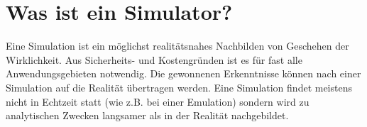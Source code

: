 ﻿\section{Was ist ein Simulator?}

Eine Simulation ist ein möglichst realitätsnahes Nachbilden von Geschehen der Wirklichkeit. Aus Sicherheits- und Kostengründen ist es für fast alle Anwendungsgebieten notwendig. Die gewonnenen Erkenntnisse können nach einer Simulation auf die Realität übertragen werden. Eine Simulation findet meistens nicht in Echtzeit statt (wie z.B. bei einer Emulation) sondern wird zu analytischen Zwecken langsamer als in der Realität nachgebildet.